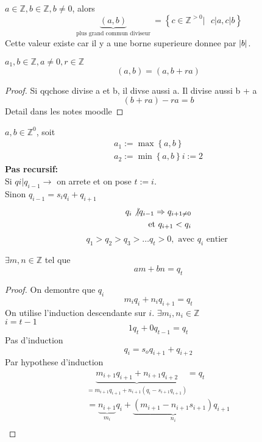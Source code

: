 \documentclass[../main.tex]{subfiles}
\begin{document}
\begin{defn}
	$a \in \mathbb{Z}, b \in \mathbb{Z}, b \neq 0$, alors
	\[ 
		\underbrace{( a,b)}_{ \text{ plus grand commun diviseur } }= \left\{ c \in \mathbb{Z}^{>0} \vert \text{    }  c \vert a, c \vert b \right\} 
	\]
	Cette valeur existe car il y a une borne superieure donnee par $\left\vert b\right\vert$.\\
	
\end{defn}
\begin{lemma}
$ a_1, b \in \mathbb{Z}, a \neq 0, r \in \mathbb{Z}$
\[ 
	( a,b) = ( a,b+ra)
\]

\end{lemma}
\begin{proof}
Si qqchose divise a et b, il divse aussi a. Il divise aussi b + a
\[ 
	( b+ra) -ra = b
\]
Detail dans les notes moodle
\end{proof}
\begin{defn}\label{defn:algorithme_d_euclide}
	$a,b \in \mathbb{Z}^{0}$, soit
\begin{align*}
a_1:= \max \left\{ a,b \right\} \\
a_2 := \min \left\{ a,b \right\} 
i:=2
\end{align*}
\textbf{ Pas recursif: }\\
Si $qi \vert q_{i-1} \rightarrow$ on arrete et on pose $t:=i$.\\
Sinon $q_{i-1} = s_i q_i + q_{i+1} $
\begin{align*}
q_i \not\vert q_{i-1} \Rightarrow q_{i+1 \neq 0}\\
\text{ et } q_{i+1} < q_i
\end{align*}
\[ 
q_1>q_2>q_3> \ldots q_t >0, \text{ avec } q_i \text{ entier }
\]
\end{defn}
\begin{lemma}
$\exists m,n \in \mathbb{Z}$ tel que
\[ 
am + bn = q_t
\]

\end{lemma}
\begin{proof}
On demontre que $q_i$ 
\[ 
m_i q_i + n_i q_{i+1} = q_t
\]
On utilise l'induction descendante sur $i$.
$\exists m_i, n_i \in \mathbb{Z}$ \\
$i=t-1$
\[ 
1 q_t + 0 q_{t-1} = q_t
\]
Pas d'induction\\
\[ 
q_i = s_o q_{i+1}  + q_{i+2} 
\]
Par hypothese d'induction
\begin{align*}
\underbrace{m_{i+1} q_{i+1 } + n_{i+1} q_{i+2}}_{= m_{i+1} q_{i+1} + n_{i+1} ( q_i - s_{i+1} q_{i+1} )} = q_t\\
= \underbrace{n_{i+1}}_{m_i} q_i + \underbrace{( m_{i+1} - n_{i+1} s_{i+1})}_{n_i} q_{i+1} \\
\end{align*}
\end{proof}
\end{document}
